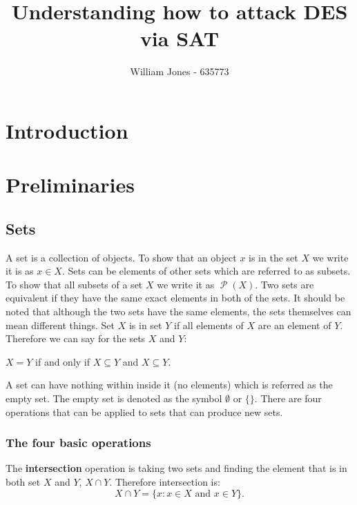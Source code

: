 \documentclass[11pt,a4paper]{report}
\author{William Jones - 635773}
\DeclareMathOperator{\power}{\mathcal{P}}
\begin{document}
\title{Understanding how to attack DES via SAT}
\maketitle
\tableofcontents

\chapter{Introduction}
\label{cha:Introduction}


\chapter{Preliminaries}
\label{cha:prelim}


\section{Sets}
\label{sec:sets}

A set is a collection of objects. To show that an object $x$ is in the set $X$ we write it is as $x \in X$. Sets can be elements of other sets which are referred to as subsets. To show that all subsets of a set $X$ we write it as $\power(X)$. Two sets are equivalent if they have the same exact elements in both of the sets. It should be noted that although the two sets have the same elements, the sets themselves can mean different things. Set $X$ is in set $Y$ if all elements of $X$ are an element of $Y$.
Therefore we can say for the sets $X$ and $Y$:
\begin{center}
  $X=Y$ if and only if $X \subseteq Y$ and $X \subseteq Y$.
\end{center}
A set can have nothing within inside it (no elements) which is referred as the empty set. The empty set is denoted as the symbol $\emptyset$ or $\{\}$. There are four operations that can be applied to sets that can produce new sets.  

\subsection{The four basic operations}
\label{sec:fourbasop}

The \textbf{intersection} operation is taking two sets and finding the element that is in both set $X$ and $Y$, $X \cap Y$. Therefore intersection is:
\begin{displaymath}
  X \cap Y = \{x : x \in X  \text{ and } x \in Y\}.
\end{displaymath}
\end{document}
